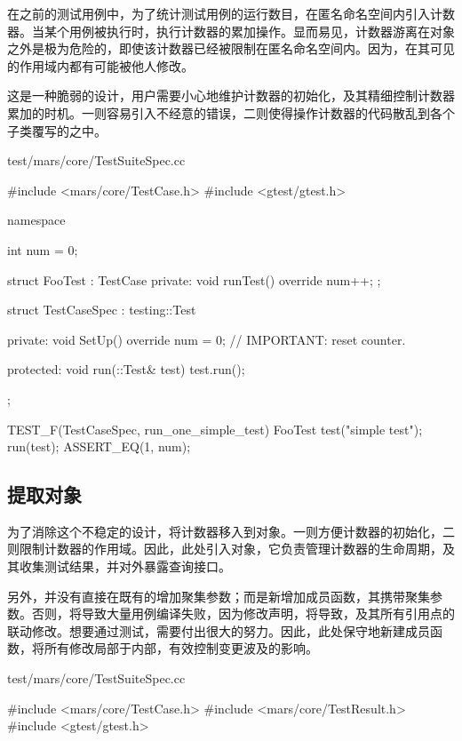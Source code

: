 \begin{content}

在之前的测试用例中，为了统计测试用例的运行数目，在匿名命名空间内引入计数器。当某个用例被执行时，执行计数器的累加操作。显而易见，计数器游离在对象之外是极为危险的，即使该计数器已经被限制在匿名命名空间内。因为，在其可见的作用域内都有可能被他人修改。

这是一种脆弱的设计，用户需要小心地维护计数器的初始化，及其精细控制计数器累加的时机。一则容易引入不经意的错误，二则使得操作计数器的代码散乱到各个子类覆写的之中。

\begin{nodiff}{test/mars/core/TestSuiteSpec.cc}
 \begin{c++}
#include <mars/core/TestCase.h>
#include <gtest/gtest.h>

namespace {
  int num = 0;

  struct FooTest : TestCase {
  private:
    void runTest() override {
      num++;
    }
  };

  struct TestCaseSpec : testing::Test {
  private:
    void SetUp() override {
      num = 0;  // IMPORTANT: reset counter.
    }

  protected:
    void run(::Test& test) {
      test.run();
    }
  };
}

TEST_F(TestCaseSpec, run_one_simple_test) {
  FooTest test("simple test");
  run(test);
  ASSERT_EQ(1, num);
}
 \end{c++}
\end{nodiff}

\subsection{提取对象}

为了消除这个不稳定的设计，将计数器移入到对象。一则方便计数器的初始化，二则限制计数器的作用域。因此，此处引入对象，它负责管理计数器的生命周期，及其收集测试结果，并对外暴露查询接口。

另外，并没有直接在既有的增加聚集参数；而是新增加成员函数，其携带聚集参数。否则，将导致大量用例编译失败，因为修改声明，将导致，及其所有引用点的联动修改。想要通过测试，需要付出很大的努力。因此，此处保守地新建成员函数，将所有修改局部于内部，有效控制变更波及的影响。

\begin{nodiff}{test/mars/core/TestSuiteSpec.cc}
 \begin{c++}
#include <mars/core/TestCase.h>
#include <mars/core/TestResult.h>
#include <gtest/gtest.h>


\end{c++}
\end{nodiff}
\end{content}
